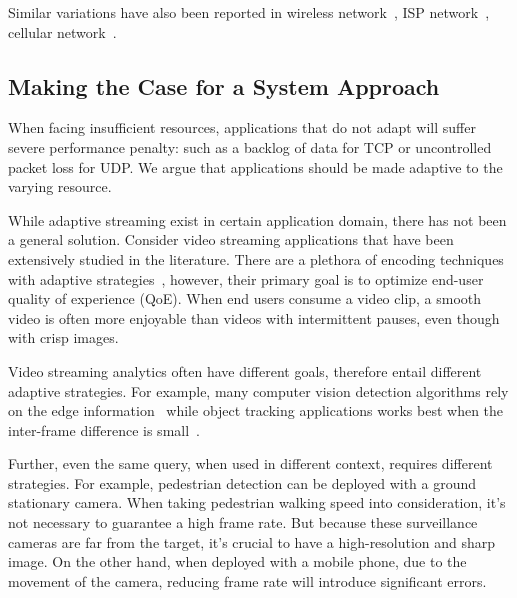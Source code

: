 Similar variations have also been reported in wireless
network~\cite{biswas2015large}, ISP network~\cite{grover2013peeking}, cellular
network~\cite{nikravesh2014mobile}.


\subsection{Making the Case for a System Approach}
\label{sec:bat}

When facing insufficient resources, applications that do not adapt will suffer
severe performance penalty: such as a backlog of data for TCP or uncontrolled
packet loss for UDP. We argue that applications should be made adaptive to the
varying resource.

While adaptive streaming exist in certain application domain, there has not been
a general solution. Consider video streaming applications that have been
extensively studied in the literature. There are a plethora of encoding
techniques~\cite{richardson2011h, grange2016vp9} with adaptive
strategies~\cite{yin2015control, michalos2012dynamic, pantos2016http}, however,
their primary goal is to optimize end-user quality of experience (QoE).  When
end users consume a video clip, a smooth video is often more enjoyable than
videos with intermittent pauses, even though with crisp images.

Video streaming analytics often have different goals, therefore entail different
adaptive strategies. For example, many computer vision detection algorithms rely
on the edge information~\cite{canny1986computational, lowe2004distinctive,
  viola2001rapid} while object tracking applications works best when the
inter-frame difference is small~\cite{allen2004object}.

Further, even the same query, when used in different context, requires different
strategies. For example, pedestrian detection can be deployed with a ground
stationary camera. When taking pedestrian walking speed into consideration, it's
not necessary to guarantee a high frame rate. But because these surveillance
cameras are far from the target, it's crucial to have a high-resolution and
sharp image. On the other hand, when deployed with a mobile phone, due to the
movement of the camera, reducing frame rate will introduce significant
errors.

